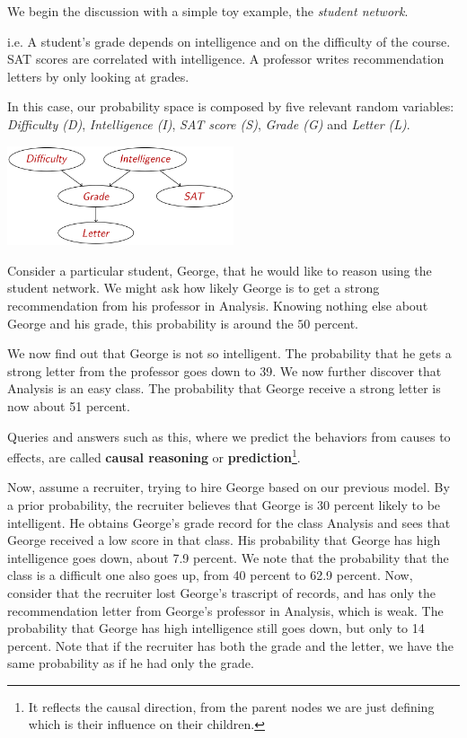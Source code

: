 We begin the discussion with a simple toy example, the \textit{student network}.
\begin{example}
    i.e. A student's grade depends on intelligence and on the difficulty of the course.
    SAT scores are correlated with intelligence. A professor writes recommendation letters by only looking at grades. \vspace{3.5pt}

    In this case, our probability space is composed by five relevant random variables: \textit{Difficulty (D)}, \textit{Intelligence (I)}, \textit{SAT score (S)}, \textit{Grade (G)} and \textit{Letter (L)}. \vspace{3.5pt}
    \begin{center}
        \includegraphics[width=0.5\textwidth]{img/img4.png}
    \end{center} \vspace{3.5pt}
    Consider a particular student, George, that he would like to reason using the student network. We might ask how likely George is to get a strong recommendation from his professor in Analysis.
    Knowing nothing else about George and his grade, this probability is around the $50$ percent. \vspace{3.5pt}

    We now find out that George is not so intelligent. The probability that he gets a strong letter from the professor goes down to 39. We now further discover that Analysis is an easy class.
    The probability that George receive a strong letter is now about 51 percent. \vspace{3.5pt}

    Queries and answers such as this, where we predict the behaviors from causes to effects, are called \textbf{causal reasoning} or \textbf{prediction}\footnote{It reflects the causal direction, from the parent nodes we are just defining which is their influence on their children.}. \vspace{3.5pt}

    Now, assume a recruiter, trying to hire George based on our previous model. By a prior probability, the recruiter believes that George is 30 percent likely to be intelligent. 
    He obtains George's grade record for the class Analysis and sees that George received a low score in that class. His probability that George has high intelligence goes down,
    about 7.9 percent. We note that the probability that the class is a difficult one also goes up, from 40 percent to 62.9 percent. Now, consider that the recruiter lost George's trascript of records, and has only the recommendation letter from George's professor in Analysis, which is weak.
    The probability that George has high intelligence still goes down, but only to 14 percent. Note that if the recruiter has both the grade and the letter, we have the same probability
    as if he had only the grade. \vspace{3.5pt}


\end{example}
